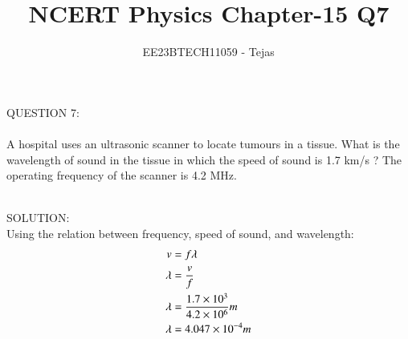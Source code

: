 \documentclass[journal,12pt,twocolumn]{IEEEtran}
\theoremstyle{remark}
\begin{document}

\vspace{3cm}

\title{NCERT Physics Chapter-15 Q7}
\author{EE23BTECH11059 - Tejas$^{}$%
}
\maketitle
\newpage

\Huge{QUESTION 7:} \\ \\
        \medskip
        \Large
A hospital uses an ultrasonic scanner to locate tumours in a tissue. What is the
wavelength of sound in the tissue in which the speed of sound is 1.7 km/s ? The operating frequency of the scanner is 4.2 MHz.

    \bigskip
    \Large
    \\
        \LARGE
        SOLUTION: \\
        \Large
        Using the relation between frequency, speed of sound, and wavelength:
         \\
          \begin{align}
           v &= f \lambda \\
\lambda &= \frac{v}{f} \notag \\
\lambda &= \frac{1.7 \times 10^3}{4.2 \times 10^6}m \notag \\
\lambda &= 4.047 \times 10^{-4}m
        \end{align}
        
        
        
             
             
        

        













\renewcommand{\thefigure}{\theenumi}
\renewcommand{\thetable}{\theenumi}
\end{document}
